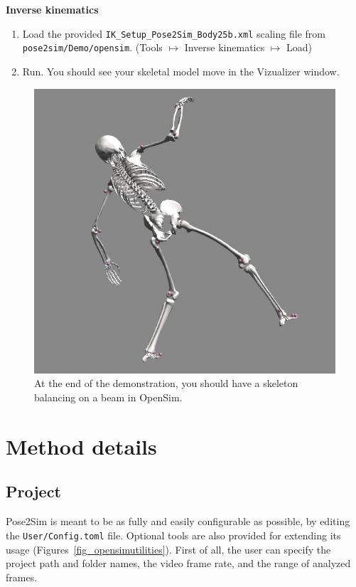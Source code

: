 \textbf{Inverse kinematics}
\begin{enumerate}[itemsep=0em, topsep=0em, leftmargin=*]
    \item Load the provided \texttt{IK_Setup_Pose2Sim_Body25b.xml} scaling file from \texttt{pose2sim/Demo/opensim}. (Tools $\mapsto$ Inverse kinematics $\mapsto$ Load)
    \item Run. You should see your skeletal model move in the Vizualizer window.
\end{enumerate}

\begin{figure}[hbtp]
	\centering
	\def\svgwidth{1\columnwidth}
	\fontsize{10pt}{10pt}\selectfont
	\includegraphics[width=\linewidth]{"../Chap3/Figures/OpenSimDemo.JPG"}
	\caption{At the end of the demonstration, you should have a skeleton balancing on a beam in OpenSim.}
	\label{fig_opensimdemo}
\end{figure}


\section{Method details}

\subsection{Project}
Pose2Sim is meant to be as fully and easily configurable as possible, by editing the \texttt{User/Config.toml} file. Optional tools are also provided for extending its usage (Figures~\ref{fig_opensimutilities}). First of all, the user can specify the project path and folder names, the video frame rate, and the range of analyzed frames.

